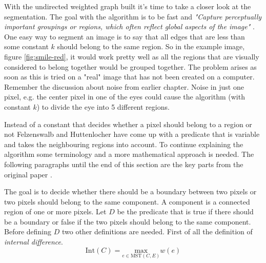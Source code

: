 With the undirected weighted graph built it's time to take a closer look at the
segmentation. The goal with the algorithm is to be fast and {\em "Capture perceptually
important groupings or regions, which often reflect global aspects of the image"} \cite{felzenszwalb2004}.
One easy way to segment an image is to say that all edges that are less than some
constant \(k\) should belong to the same region. So in the example image, figure \ref{fig:smile-red},
it would work pretty well as all the regions that are visually considered to belong
together would be grouped together. The problem arises as soon as this is tried
on a "real" image that has not been created on a computer. Remember the discussion
about noise from earlier chapter. Noise in just one pixel, e.g. the center
pixel in one of the eyes could cause the algorithm (with constant \(k\)) to divide
the eye into 5 different regions.

Instead of a constant that decides whether a pixel should belong to a region or
not Felzenswalb and Huttenlocher have come up with a predicate that is variable
and takes the neighbouring regions into account. To continue explaining the
algorithm some terminology and a more mathematical approach is needed. The following
paragraphs until the end of this section are the key parts from the original paper \cite[ch. 3.1 Pairwise
Region Comparison Predicate]{felzenszwalb2004}.

The goal is to decide whether there should be a boundary between two pixels or
two pixels should belong to the same component. A component is a connected region of one
or more pixels. Let \(D\) be the predicate that is true if there should be a
boundary or false if the two pixels should belong to the same component. Before
defining \(D\) two other definitions are needed. First of all the definition
of {\em internal difference}.
\begin{equation}
    \label{eq:internalDifference}
    \text{Int}(C) = \underset{e \in \text{MST}(C,E)}{\text{max}} w(e)
\end{equation}


